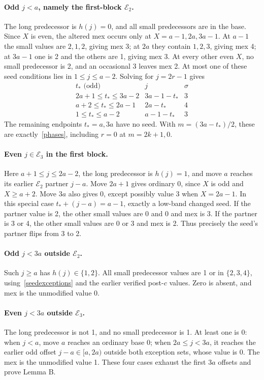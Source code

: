 \documentclass[10pt,a4paper]{article}
\newcommand{\E}{\mathcal E}
\begin{document}
\paragraph{Odd $j<a$, namely the first-block $\E_2$.}
The long predecessor is $h(j)=0$, and all small predecessors are in the base. Since $X$ is even, the altered mex occurs only at $X=a-1,2a,3a-1$. At $a-1$ the small values are $2,1,2$, giving mex 3; at $2a$ they contain $1,2,3$, giving mex 4; at $3a-1$ one is 2 and the others are 1, giving mex 3. At every other even $X$, no small predecessor is 2, and an occasional 3 leaves mex 2. At most one of these seed conditions lies in $1\le j\le a-2$. Solving for $j=2r-1$ gives
\begin{equation}\label{tseed}
\begin{array}{c|c|c}
 t_*\text{ (odd)}&j&\sigma\\\hline
 2a+1\le t_*\le3a-2&3a-1-t_*&3\\
 a+2\le t_*\le2a-1&2a-t_*&4\\
 1\le t_*\le a-2&a-1-t_*&3
\end{array}
\end{equation}
The remaining endpoints $t_*=a,3a$ have no seed. With $m=(3a-t_*)/2$, these are exactly~\eqref{phases}, including $r=0$ at $m=2k+1,0$.

\paragraph{Even $j\in\E_3$ in the first block.}
Here $a+1\le j\le2a-2$, the long predecessor is $h(j)=1$, and move $a$ reaches its earlier $\E_2$ partner $j-a$. Move $2a+1$ gives ordinary 0, since $X$ is odd and $X\ge a+2$. Move $3a$ also gives 0, except possibly value 3 when $X=2a-1$. In this special case $t_*+(j-a)=a-1$, exactly a low-band changed seed. If the partner value is 2, the other small values are 0 and 0 and mex is 3. If the partner is 3 or 4, the other small values are 0 or 3 and mex is 2. Thus precisely the seed's partner flips from 3 to 2.

\paragraph{Odd $j<3a$ outside $\E_2$.}
Such $j\ge a$ has $h(j)\in\{1,2\}$. All small predecessor values are 1 or in $\{2,3,4\}$, using~\eqref{seedexceptions} and the earlier verified post-$c$ values. Zero is absent, and mex is the unmodified value 0.

\paragraph{Even $j<3a$ outside $\E_3$.}
The long predecessor is not 1, and no small predecessor is 1. At least one is 0: when $j<a$, move $a$ reaches an ordinary base 0; when $2a\le j<3a$, it reaches the earlier odd offset $j-a\in[a,2a)$ outside both exception sets, whose value is 0. The mex is the unmodified value 1. These four cases exhaust the first $3a$ offsets and prove Lemma B.
\end{document}
